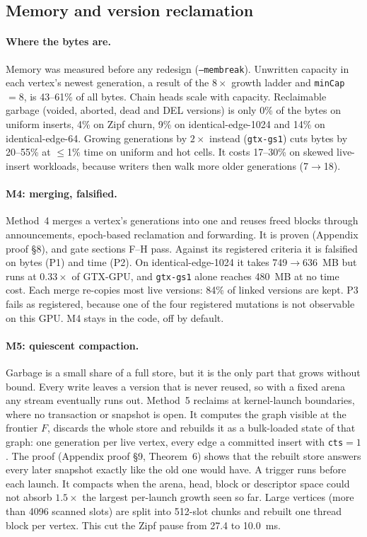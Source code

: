 \documentclass[sigconf,nonacm]{acmart}
\newcommand{\sys}{GTX-GPU}
\newcommand{\code}[1]{\texttt{#1}}
\begin{document}
\subsection{Memory and version reclamation}
\label{sec:memory}
\paragraph{Where the bytes are.} Memory was measured before any redesign (\code{--membreak}). Unwritten capacity in
each vertex's newest generation, a result of the $8\times$ growth ladder and \code{minCap}${=}8$, is 43--61\% of all
bytes. Chain heads scale with capacity. Reclaimable garbage (voided, aborted, dead and DEL versions) is only 0\% of the
bytes on uniform inserts, 4\% on Zipf churn, 9\% on identical-edge-1024 and 14\% on identical-edge-64. Growing
generations by $2\times$ instead (\code{gtx-gs1}) cuts bytes by 20--55\% at $\le$1\% time on uniform and hot cells. It
costs 17--30\% on skewed live-insert workloads, because writers then walk more older generations (7$\to$18).

\paragraph{M4: merging, falsified.} Method~4 merges a vertex's generations into one and reuses freed blocks through
announcements, epoch-based reclamation and forwarding. It is proven (Appendix proof \S8), and gate sections F--H pass.
Against its registered criteria it is falsified on bytes (P1) and time (P2). On identical-edge-1024 it takes 749$\to$636~MB
but runs at $0.33\times$ of \sys{}, and \code{gtx-gs1} alone reaches 480~MB at no time cost. Each merge re-copies most
live versions: 84\% of linked versions are kept. P3 fails as registered, because one of the four registered
mutations is not observable on this GPU. M4 stays in the code, off by default.

\paragraph{M5: quiescent compaction.} Garbage is a small share of a full store, but it is the only part that grows
without bound. Every write leaves a version that is never reused, so with a fixed arena any stream eventually runs
out. Method~5 reclaims at kernel-launch boundaries, where no transaction or snapshot is open. It computes the graph
visible at the frontier $F$, discards the whole store and rebuilds it as a bulk-loaded state of that graph: one
generation per live vertex, every edge a committed insert with \code{cts}${=}1$. The proof (Appendix proof \S9,
Theorem~6) shows that the rebuilt store answers every later snapshot exactly like the old one would have. A trigger
runs before each launch. It compacts when the arena, head, block or descriptor space could not absorb $1.5\times$ the
largest per-launch growth seen so far. Large vertices (more than 4096 scanned slots) are split into 512-slot chunks and
rebuilt one thread block per vertex. This cut the Zipf pause from 27.4 to 10.0~ms.
\end{document}
